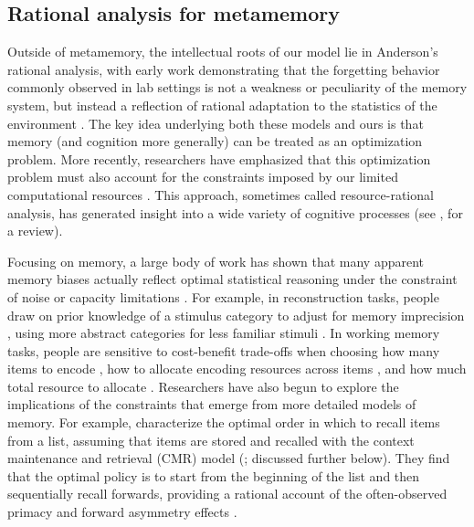 \subsection{Rational analysis for metamemory}

Outside of metamemory, the intellectual roots of our model lie in Anderson's \citeyearpar{anderson1990adaptive} rational analysis, with early work demonstrating that the forgetting behavior commonly observed in lab settings is not a weakness or peculiarity of the memory system, but instead a reflection of rational adaptation to the statistics of the environment \citep{anderson1989human}. The key idea underlying both these models and ours is that memory (and cognition more generally) can be treated as an optimization problem. More recently, researchers have emphasized that this optimization problem must also account for the constraints imposed by our limited computational resources \citep{griffiths2015rational,howes2009rational,lewis2014computational,gershman2015computational}. This approach, sometimes called resource-rational analysis, has generated insight into a wide variety of cognitive processes (see \citealp{lieder2020resourcerational}, for a review).

Focusing on memory, a large body of work has shown that many apparent memory biases actually reflect optimal statistical reasoning under the constraint of noise or capacity limitations \citep{gershman2021rational}. For example, in reconstruction tasks, people draw on prior knowledge of a stimulus category to adjust for memory imprecision \citep{huttenlocher2000categories}, using more abstract categories for less familiar stimuli \citep{hemmer2009bayesian}. In working memory tasks, people are sensitive to cost-benefit trade-offs when choosing how many items to encode \citep{howes2016predicting}, how to allocate encoding resources across items \citep{yoo2018strategic}, and how much total resource to allocate \citep{vandenberg2018resourcerational}. Researchers have also begun to explore the implications of the constraints that emerge from more detailed models of memory. For example, \citet{zhang2022optimal} characterize the optimal order in which to recall items from a list, assuming that items are stored and recalled with the context maintenance and retrieval (CMR) model (\citealp{polyn2009context}; discussed further below). They find that the optimal policy is to start from the beginning of the list and then sequentially recall forwards, providing a rational account of the often-observed primacy and forward asymmetry effects \citep{zhang2022optimal}.

